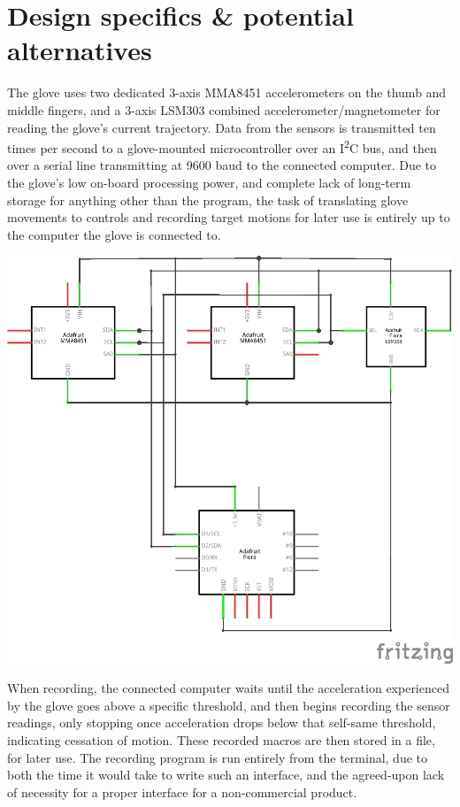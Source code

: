 \documentclass{article}
\begin{document}
	\section{Design specifics \& potential alternatives}
	
	The glove uses two dedicated 3-axis MMA8451 accelerometers on the thumb and middle fingers, and a 3-axis LSM303 combined accelerometer/magnetometer for reading the glove's current trajectory. Data from the sensors is transmitted ten times per second to a glove-mounted microcontroller over an I\textsuperscript{2}C bus, and then over a serial line transmitting at 9600 baud to the connected computer. Due to the glove's low on-board processing power, and complete lack of long-term storage for anything other than the program, the task of translating glove movements to controls and recording target motions for later use is entirely up to the computer the glove is connected to. 
	
	\includegraphics{Glove_schematic}
	
	When recording, the connected computer waits until the acceleration experienced by the glove goes above a specific threshold, and then begins recording the sensor readings, only stopping once acceleration drops below that self-same threshold, indicating cessation of motion. These recorded macros are then stored in a file, for later use. The recording program is run entirely from the terminal, due to both the time it would take to write such an interface, and the agreed-upon lack of necessity for a proper interface for a non-commercial product.
	
\end{document}
